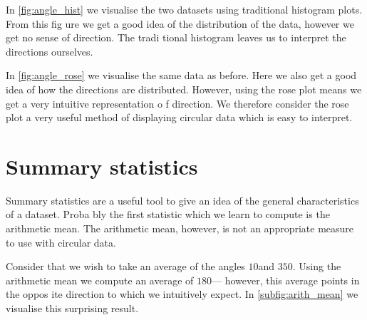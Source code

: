 In \cref{fig:angle_hist} we visualise the two datasets using traditional histogram plots. From this fig
ure we get a good idea of the distribution of the data, however we get no sense of direction. The tradi
tional histogram leaves us to interpret the directions ourselves.

In \cref{fig:angle_rose} we visualise the same data as before. Here we also get a good idea of how the 
directions are distributed. However, using the rose plot means we get a very intuitive representation o
f direction. We therefore consider the rose plot a very useful method of displaying circular data which
 is easy to interpret.

\section{Summary statistics}
\label{sec:summary_stats}

Summary statistics are a useful tool to give an idea of the general characteristics of a dataset. Proba
bly the first statistic which we learn to compute is the arithmetic mean. The arithmetic mean, however,
 is not an appropriate measure to use with circular data.

Consider that we wish to take an average of the angles $10$\textdegree and $350$\textdegree. Using the 
arithmetic mean we compute an average of $180$\textdegree --- however, this average points in the oppos
ite direction to which we intuitively expect. In \cref{subfig:arith_mean} we visualise this surprising 
result.

